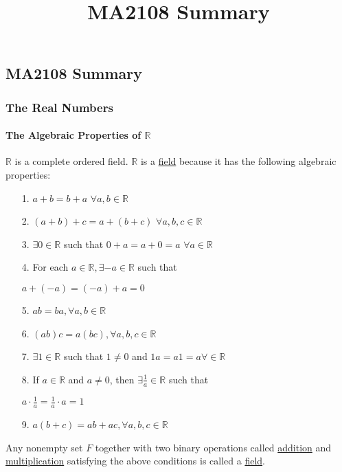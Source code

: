 \documentclass[10pt, twocolumn]{article}
\title{MA2108 Summary}
\begin{document}
\begin{center}
\part*{MA2108 Summary}
\end{center}
\tableofcontents
\newpage
\onehalfspacing

\section{The Real Numbers}
\subsection{The Algebraic Properties of $\mathbb{R}$}
$\mathbb{R}$ is a complete ordered field.
\newline
$\mathbb{R}$ is a \underline{field} because it has the following algebraic properties:
\begin{enumerate}
\item[1.]{$a+b=b+a$ \hspace{20pt} $\forall a,b \in \mathbb{R}$}
\item[2.]{$(a+b)+c=a+(b+c)$ \hspace{20pt} $\forall a,b,c \in \mathbb{R}$}
\item[3.]{$\exists 0 \in \mathbb{R}$ such that $0+a=a+0=a$ \hspace{20pt} $\forall a \in \mathbb{R}$}
\item[4.]{For each $a \in \mathbb{R}, \exists -a \in \mathbb{R}$ such that}
\begin{center}
$a+(-a)=(-a)+a=0$
\end{center}
\item[5.]{$ab=ba, \forall a,b \in \mathbb{R}$}
\item[6.]{$(ab)c=a(bc), \forall a,b,c \in \mathbb{R}$}
\item[7.]{$\exists 1 \in \mathbb{R}$ such that $1 \neq 0$ and $1a=a1=a \forall\in\mathbb{R}$}
\item[8.]{If $a \in \mathbb{R}$ and $a \neq 0$, then $\exists \frac{1}{a} \in \mathbb{R}$ such that}
\begin{center}
$a \cdot \frac{1}{a} = \frac{1}{a} \cdot a = 1$
\end{center}
\item[9.]{$a(b+c)=ab+ac, \forall a,b,c \in \mathbb{R}$}
\end{enumerate}
Any nonempty set $F$ together with two binary operations called \underline{addition} and \underline{multiplication} satisfying the above conditions is called a \underline{field}.
\end{document}
